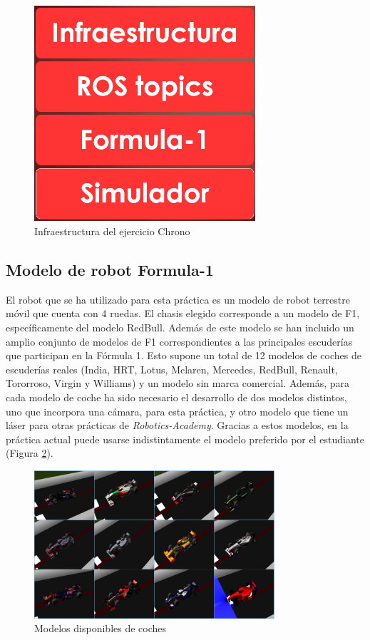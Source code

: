 \begin{figure}[H]
  \begin{center}
    \includegraphics[width=0.4\linewidth, height=8cm]{figures/infraestructura_ch.png}
		\caption{Infraestructura del ejercicio Chrono}
		\label{fig.infraestructura_ch}
		\end{center}
\end{figure}

\subsection{Modelo de robot Formula-1}
El robot que se ha utilizado para esta práctica es un modelo de robot terrestre móvil que cuenta con 4 ruedas. El chasis elegido corresponde a un modelo de F1, específicamente del modelo RedBull. Además de este modelo se han incluido un amplio conjunto de modelos de F1 correspondientes a las principales escuderías que participan en la Fórmula 1. Esto supone un total de 12 modelos de coches de escuderías reales (India, HRT, Lotus, Mclaren, Mercedes, RedBull, Renault, Tororroso, Virgin y Williams) y un modelo sin marca comercial. Además, para cada modelo de coche ha sido necesario el desarrollo de dos modelos distintos, uno que incorpora una cámara, para esta práctica, y otro modelo que tiene un láser para otras prácticas de \textit{Robotics-Academy}. Gracias a estos modelos, en la práctica actual puede usarse indistintamente el modelo preferido por el estudiante (Figura \ref{fig.f1s}).

\begin{figure}[H]
  \begin{center}
    \includegraphics[width=0.99\linewidth, height=5.5cm]{figures/coches.png}
		\caption{Modelos disponibles de coches}
		\label{fig.f1s}
		\end{center}
\end{figure}

